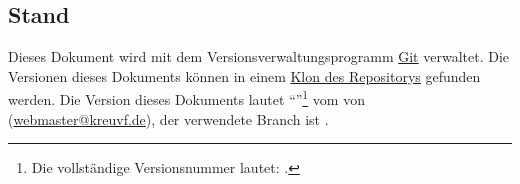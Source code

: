 \subsection{Stand}
Dieses Dokument wird mit dem Versionsverwaltungsprogramm \href{https://git-scm.com/}{Git} verwaltet. Die Versionen dieses Dokuments können in einem \href{https://github.com/kreuvf/dsa-sucht-drogen}{Klon des Repositorys} gefunden werden. Die Version dieses Dokuments lautet \enquote{\gitAbbrevHash{}}\footnote{Die vollständige Versionsnummer lautet: \gitHash{}.} vom \gitAuthorIsoDate{} von \gitAuthorName{} (\href{mailto:webmaster@kreuvf.de}{webmaster@kreuvf.de}), der verwendete Branch ist \gitBranch.


